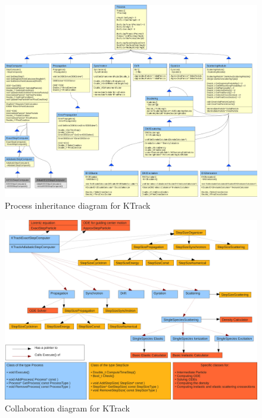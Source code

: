 \newpage
\thispagestyle{empty}
    \begin{figure}[t]
        \vspace*{-3.5cm}
        \hspace*{-3.7cm}
        \includegraphics[angle=90,scale=0.58]{./images/KTrackPlots/KTrackProcessInheritance.pdf}
        \caption{Process inheritance diagram for KTrack}
    \end{figure}

\newpage
\thispagestyle{empty}
    \begin{figure}[t]
        \vspace*{-3.5cm}
        \hspace*{-3.2cm}
        \includegraphics[angle=90,scale=0.75]{./images/KTrackPlots/KTrackDiagramNew.pdf}
        \caption{Collaboration diagram for KTrack}
    \end{figure}


